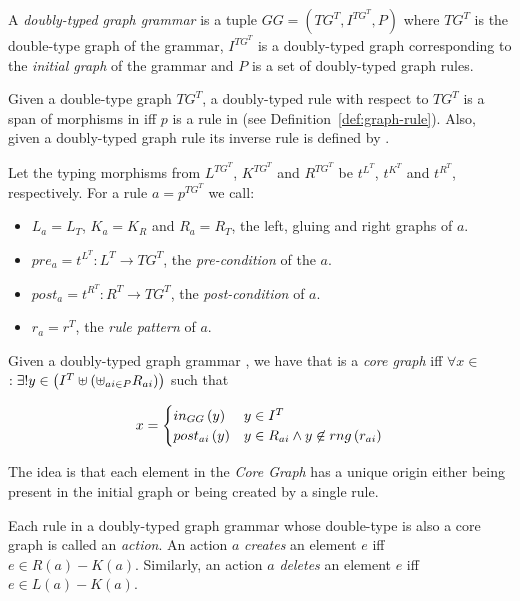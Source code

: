 \begin{definition} A \emph{doubly-typed graph grammar} is a tuple $GG = \left(TG^T, I^{TG^T},P \right)$ where $TG^T$ is the double-type graph of the grammar, $I^{TG^T}$ is a doubly-typed graph corresponding to the \emph{initial graph} of the grammar and $P$ is a set of doubly-typed graph rules. 
\end{definition}

\begin{definition} Given a double-type graph $TG^T$, a doubly-typed rule with respect to $TG^T$ is a span of morphisms \doublyTypedRule{} in \doublyTypedGraphCategory{} iff $p$ is a rule in \typedGraphCategory{} (see Definition~\ref{def:graph-rule}). Also, given a doubly-typed graph rule \doublyTypedRule{} its inverse rule is defined by \inverseDoublyTypedRule{}.

  Let the typing morphisms from $L^{TG^T}$, $K^{TG^T}$ and $R^{TG^T}$ be $t^{L^T}$, $t^{K^T}$ and $t^{R^T}$, respectively. For a rule $a = p^{TG^T}$ we call:

  \begin{itemize}
    \item $L_a = L_T$, $K_a = K_R$ and $R_a = R_T$, the left, gluing and right graphs of $a$.
    \item $pre_a = t^{L^T} : L^T \rightarrow TG^T$, the \emph{pre-condition} of the $a$.
    \item $post_a = t^{R^T} : R^T \rightarrow TG^T$, the \emph{post-condition} of $a$.
    \item $r_a = r^T$, the \emph{rule pattern} of $a$.
  \end{itemize}
\end{definition}

\begin{definition} Given a doubly-typed graph grammar \doublyTypedGraphGrammarCore{}, we have that \coreGraph{} is a \emph{core graph} iff $\forall x \in$ \coreGraph $: \exists! y \in \left(I^T \uplus \left(\uplus_{ai \in P} R_{ai}\right)\right)$ such that

  \[ x =
    \begin{cases}
      in_{GG}\left(y\right) & y \in I^T\\
      post_{ai}\left(y\right) & y \in R_{ai} \land y \not\in rng\left(r_{ai}\right)\\
    \end{cases}
   \]

  \begin{intuition} The idea is that each element in the \emph{Core Graph} has a unique origin either being present in the initial graph or being created by a single rule.
\end{intuition}

  Each rule in a doubly-typed graph grammar whose double-type is also a core graph is called an \emph{action}. An action $a$ \emph{creates} an element $e$ iff $e \in R(a) - K(a)$. Similarly, an action $a$ \emph{deletes} an element $e$ iff $e \in L(a) - K(a)$.

\end{definition}

